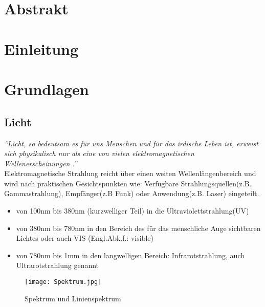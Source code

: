 \documentclass{article}
\begin{document}
\begin{titlepage}
\begin{center}
  \bfseries
  \huge 
  \\[4em]
  \Large 
  \\[6em]
  \large
\end{center}
\end{titlepage}
\newpage
\tableofcontents
\newpage
\section{Abstrakt}


\section{Einleitung}

\section{Grundlagen}\label{grundlagen}

\subsection{Licht}
\textsl{``Licht, so bedeutsam es für uns Menschen und für das irdische Leben ist, er\-wei\-st sich physikalisch nur als eine von vielen elektromagnetischen Wellenerscheinun\-gen \cite{WulfLange}.''}
\\[1em]
Elektromagnetische Strahlung reicht über einen weiten Wellenlängenbereich und wird nach praktischen Gesichtspunkten wie: Verfügbare Strahlungsquellen(z.B. Gam\-ma\-strah\-lung), Empfänger(z.B Funk) oder Anwendung(z.B. Laser) ein\-ge\-teilt\cite{GottHans}.


\begin{itemize}
\item von 100nm bis 380nm (kurzwelliger Teil) in die Ultraviolettstrahlung(UV)
\item von 380nm bis 780nm in den Bereich des für das menschliche Auge sichtbaren Lichtes oder auch VIS (Engl.Abk.f.: visible)
\item von 780nm bis 1mm in den langwelligen Bereich: Infrarotstrahlung, auch Ultrarotstrahlung genannt
\end{itemize}

\begin{figure}[ht]
	\centering
	\texttt{[image: Spektrum.jpg]}
	\caption{Spektrum und Linienspektrum\cite{Gerthsen}}
	\label{Spektrum}
\end{figure}
\end{document}
